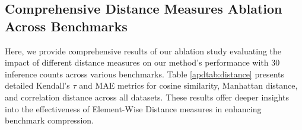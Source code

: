 \subsection{Comprehensive Distance Measures Ablation Across Benchmarks}
\label{apd:distance}
Here, we provide comprehensive results of our ablation study evaluating the impact of different distance measures on our method's performance with 30 inference counts across various benchmarks. Table \ref{apdtab:distance} presents detailed Kendall's $\tau$ and MAE metrics for cosine similarity, Manhattan distance, and correlation distance across all datasets. These results offer deeper insights into the effectiveness of Element-Wise Distance measures in enhancing benchmark compression.

